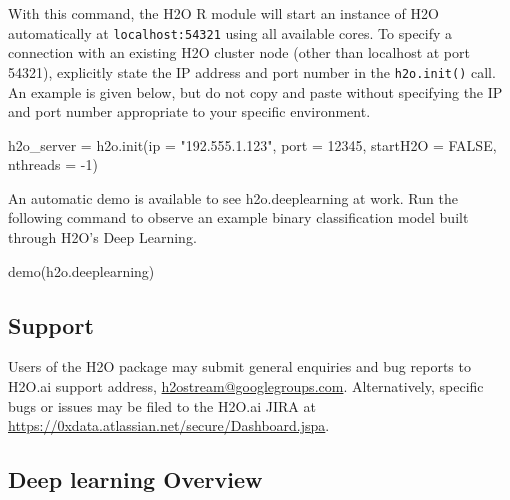 \documentclass{article}[11pt]
\begin{document}
\noindent
With this command, the H2O R module will start an instance of H2O automatically at \texttt{localhost:54321} using all available cores. To specify a connection with an existing H2O cluster node (other than localhost at port 54321), explicitly state the IP address and port number in the \texttt{h2o.init()} call. An example is given below, but do not copy and paste without specifying the IP and port number appropriate to your specific environment.
\small %
\begin{spverbatim}
h2o_server = h2o.init(ip = "192.555.1.123", port = 12345, startH2O = FALSE, nthreads = -1)
\end{spverbatim}
\normalsize%
\noindent
An automatic demo is available to see h2o.deeplearning at work. Run the following command to observe an example binary classification model built through H2O's Deep Learning.
\begin{spverbatim}
demo(h2o.deeplearning)
\end{spverbatim}

\subsection{Support} 

Users of the H2O package may submit general enquiries and bug reports to H2O.ai support address, {\url{h2ostream@googlegroups.com}}. Alternatively, specific bugs or issues may be filed to the H2O.ai JIRA at {\url{https://0xdata.atlassian.net/secure/Dashboard.jspa}}.

\subsection{Deep learning Overview} 
\end{document}
